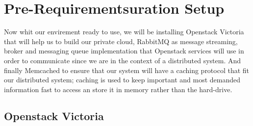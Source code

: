 \chapter{Pre-Requirementsuration Setup}
\par Now whit our envirement ready to use, we will be installing Openstack Victoria that will help us to build our private cloud, RabbitMQ as message streaming, broker and messaging queue implementation that Openstack services will use in order to communicate since we are in the context of a distributed system. And finally Memcached to ensure that our system will have a caching protocol that fit our distributed system; caching is used to keep important and most demanded information fast to access an store it in memory rather than the hard-drive.
\begin{spacing}{1.2}
\section{Openstack Victoria}


\end{spacing}
